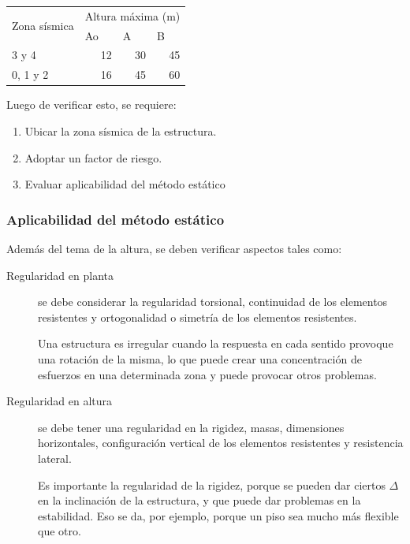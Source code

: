 \documentclass[../main.tex]{subfiles}
\begin{document}
\begin{table}[htbp]
  \centering
    \begin{tabular}{|l|r|r|r|}
    \hline
    \multicolumn{1}{|c|}{\multirow{2}[4]{*}{Zona sísmica}} & \multicolumn{3}{c|}{Altura máxima (m)} \bigstrut\\
\cline{2-4}          & \multicolumn{1}{l|}{Ao} & \multicolumn{1}{l|}{A} & \multicolumn{1}{l|}{B} \bigstrut\\
    \hline
    3 y 4 & 12    & 30    & 45 \bigstrut\\
    \hline
    0, 1 y 2 & 16    & 45    & 60 \bigstrut\\
    \hline
    \end{tabular}%
\end{table}%

Luego de verificar esto, se requiere:

\begin{enumerate}
  \item Ubicar la zona sísmica de la estructura.
  \item Adoptar un factor de riesgo.
  \item Evaluar aplicabilidad del método estático
\end{enumerate}

\subsubsection{Aplicabilidad del método estático}

Además del tema de la altura, se deben verificar aspectos tales como:

\begin{description}
  \item[Regularidad en planta] se debe considerar la regularidad torsional,
    continuidad de los elementos resistentes y ortogonalidad o simetría de los
    elementos resistentes.

    Una estructura es irregular cuando la respuesta en cada sentido provoque una
    rotación de la misma, lo que puede crear una concentración de esfuerzos en una
    determinada zona y puede provocar otros problemas.

  \item[Regularidad en altura] se debe tener una regularidad en la rigidez,
    masas, dimensiones horizontales, configuración vertical de los elementos
    resistentes y resistencia lateral.

    Es importante la regularidad de la rigidez, porque se pueden dar ciertos $\Delta$
    en la inclinación de la estructura, y que puede dar problemas en la estabilidad.
    Eso se da, por ejemplo, porque un piso sea mucho más flexible que otro.
\end{description}
\end{document}
